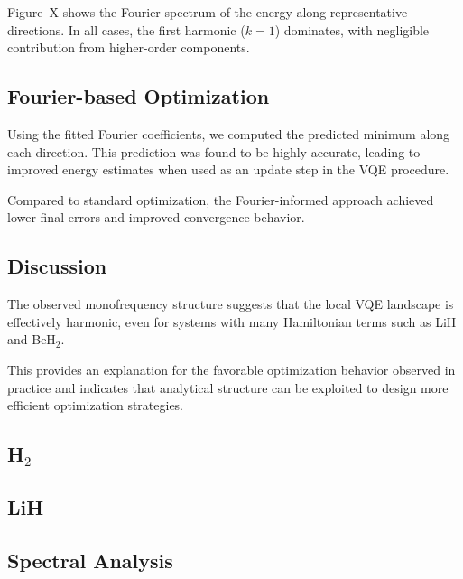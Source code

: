 \documentclass[12pt]{article}
\begin{document}
Figure~X shows the Fourier spectrum of the energy along representative directions. In all cases, the first harmonic ($k=1$) dominates, with negligible contribution from higher-order components.

\subsection{Fourier-based Optimization}

Using the fitted Fourier coefficients, we computed the predicted minimum along each direction. This prediction was found to be highly accurate, leading to improved energy estimates when used as an update step in the VQE procedure.

Compared to standard optimization, the Fourier-informed approach achieved lower final errors and improved convergence behavior.

\subsection{Discussion}

The observed monofrequency structure suggests that the local VQE landscape is effectively harmonic, even for systems with many Hamiltonian terms such as LiH and BeH$_2$.

This provides an explanation for the favorable optimization behavior observed in practice and indicates that analytical structure can be exploited to design more efficient optimization strategies.

\subsection{H$_2$}


\subsection{LiH}


\subsection{Spectral Analysis}

\end{document}
